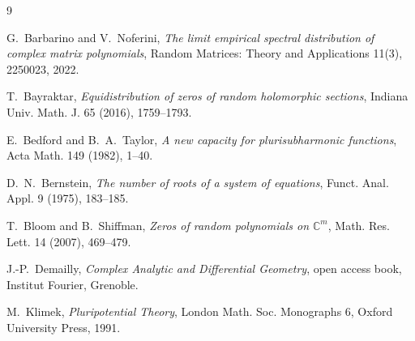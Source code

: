\documentclass[12pt]{article}
\def\C{\mathbb{C}}
\begin{document}
\begin{thebibliography}{9}

 G.~Barbarino and V.~Noferini,
\emph{The limit empirical spectral distribution of complex matrix polynomials},
Random Matrices: Theory and Applications 11(3), 2250023, 2022.

 T.~Bayraktar,
\emph{Equidistribution of zeros of random holomorphic sections},
Indiana Univ. Math. J. 65 (2016), 1759--1793.

 E.~Bedford and B.~A.~Taylor,
\emph{A new capacity for plurisubharmonic functions},
Acta Math. 149 (1982), 1--40.

 D.~N.~Bernstein,
\emph{The number of roots of a system of equations},
Funct. Anal. Appl. 9 (1975), 183--185.

 T.~Bloom and B.~Shiffman,
\emph{Zeros of random polynomials on $\C^m$},
Math. Res. Lett. 14 (2007), 469--479.

 J.-P.~Demailly,
\emph{Complex Analytic and Differential Geometry},
open access book, Institut Fourier, Grenoble.

 M.~Klimek,
\emph{Pluripotential Theory},
London Math. Soc. Monographs 6, Oxford University Press, 1991.

\end{thebibliography}
\end{document}
